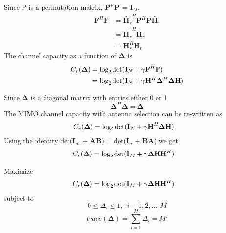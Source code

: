 \documentclass{beamer}
\begin{document}
\begin{frame}{}
Since P is a permutation matrix, \textbf{P$^H$}\textbf{P} = \textbf{I}$_M$.
\begin{align*}
\textbf{F}^H\textbf{F} &= \widetilde{\boldsymbol{H}_{r}}^H\textbf{P}^H\textbf{P}\widetilde{\boldsymbol{H}_{r}}\\
&= \widetilde{\boldsymbol{H}_{r}}^H\widetilde{\boldsymbol{H}_{r}}\\
&= \textbf{H}_r^H\textbf{H}_r
\end{align*} 
The channel capacity as a function of $\mathbf{\Delta}$ is
\begin{align*}
\mathnormal{C}_r(\mathbf{\Delta}) &=\log_{2}\text{det}(\mathbf{I}_N + \gamma\textbf{F}^H\textbf{F})\\
&= \log_{2}\text{det}(\mathbf{I}_N + \gamma\textbf{H}^H\mathbf{\Delta}^H\mathbf{\Delta}\textbf{H})
\end{align*}
\end{frame}

\begin{frame}{}
Since $\mathbf{\Delta}$ is a diagonal matrix with entries either 0 or 1\\
$$\mathbf{\Delta}^H\mathbf{\Delta}=\mathbf{\Delta}$$
The MIMO channel capacity with antenna selection can be re-written as
\begin{align*}
\mathnormal{C}_r(\mathbf{\Delta}) &=\log_{2}\text{det}(\mathbf{I}_N + \gamma\textbf{H}^H\mathbf{\Delta}\textbf{H})
\end{align*}
Using the identity det(\textbf{I$_m$} + \textbf{A}\textbf{B}) = det(\textbf{I}$_n$ + \textbf{B}\textbf{A}) we get
\begin{align*}
\mathnormal{C}_r(\mathbf{\Delta}) &=\log_{2}\text{det}(\mathbf{I}_M + \gamma\mathbf{\Delta}\textbf{H}\textbf{H}^H)
\end{align*}
\end{frame}

\begin{frame}{}
Maximize 
\begin{align*}
\mathnormal{C}_r(\mathbf{\Delta}) &=\log_{2}\text{det}(\mathbf{I}_M + \gamma\mathbf{\Delta}\textbf{H}\textbf{H}^H)
\end{align*}
subject to
$$0\leq\Delta_{i}\leq1,\enspace i=1,2,...,M$$
$$trace(\mathbf{\Delta})=\sum_{i=1}^{M} \Delta_i = M'$$
\end{frame}
\end{document}
